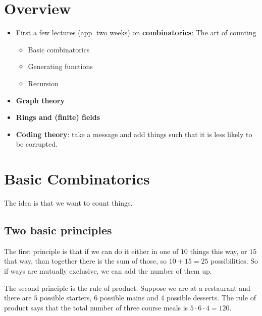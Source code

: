\documentclass[english]{lbscript}
\begin{document}


\tableofcontents{}

\pagebreak

\section{Overview}
\label{sec:overview}

\begin{itemize}
\item  First a few lectures (app. two weeks) on \textbf{combinatorics}: The art of counting
\begin{itemize}
\item Basic combinatorics
\item Generating functions
\item Recursion
\end{itemize}
\item \textbf{Graph theory} %
\item \textbf{Rings and (finite) fields}
\item \textbf{Coding theory}: take a message and add things such that it is less likely to be corrupted.
\end{itemize}


\section{Basic Combinatorics}
\label{sec:basic-combinatorics}

The idea is that we want to count things.

\subsection{Two basic principles}
\label{sec:two-basic-principles}


The first principle is that if we can do it either in one of \(10\) things this way, or \(15\) that way, than together there is the sum of those, so \(10+15=25\) possibilities. So if ways are mutually exclusive, we can add the number of them up.

The second principle is the rule of product. Suppose we are at a restaurant and there are \(5\) possible starters, \(6\) possible mains and \(4\) possible desserts. The rule of product says that  the total number of three course meals is \(5⋅6⋅4=120\).
\end{document}
